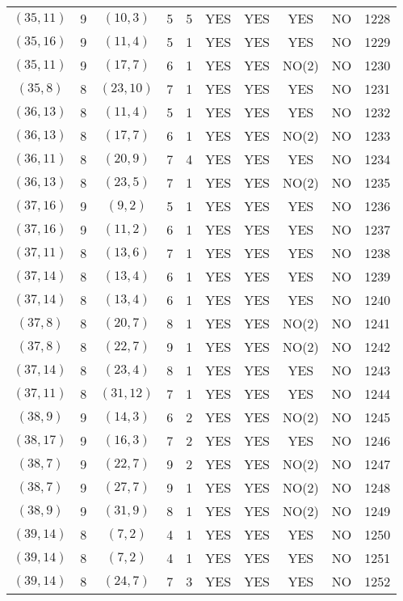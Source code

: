 \begin{longtable}{|c|c|c|c|c|c|c|c|c|c|}
$(35, 11)$ & 9 & $(10, 3)$ & 5 & 5 & YES & YES & YES & NO & 1228\\
$(35, 16)$ & 9 & $(11, 4)$ & 5 & 1 & YES & YES & YES & NO & 1229\\
$(35, 11)$ & 9 & $(17, 7)$ & 6 & 1 & YES & YES & NO(2) & NO & 1230\\
$(35, 8)$ & 8 & $(23, 10)$ & 7 & 1 & YES & YES & YES & NO & 1231\\
$(36, 13)$ & 8 & $(11, 4)$ & 5 & 1 & YES & YES & YES & NO & 1232\\
$(36, 13)$ & 8 & $(17, 7)$ & 6 & 1 & YES & YES & NO(2) & NO & 1233\\
$(36, 11)$ & 8 & $(20, 9)$ & 7 & 4 & YES & YES & YES & NO & 1234\\
$(36, 13)$ & 8 & $(23, 5)$ & 7 & 1 & YES & YES & NO(2) & NO & 1235\\
$(37, 16)$ & 9 & $(9, 2)$ & 5 & 1 & YES & YES & YES & NO & 1236\\
$(37, 16)$ & 9 & $(11, 2)$ & 6 & 1 & YES & YES & YES & NO & 1237\\
$(37, 11)$ & 8 & $(13, 6)$ & 7 & 1 & YES & YES & YES & NO & 1238\\
$(37, 14)$ & 8 & $(13, 4)$ & 6 & 1 & YES & YES & YES & NO & 1239\\
$(37, 14)$ & 8 & $(13, 4)$ & 6 & 1 & YES & YES & YES & NO & 1240\\
$(37, 8)$ & 8 & $(20, 7)$ & 8 & 1 & YES & YES & NO(2) & NO & 1241\\
$(37, 8)$ & 8 & $(22, 7)$ & 9 & 1 & YES & YES & NO(2) & NO & 1242\\
$(37, 14)$ & 8 & $(23, 4)$ & 8 & 1 & YES & YES & YES & NO & 1243\\
$(37, 11)$ & 8 & $(31, 12)$ & 7 & 1 & YES & YES & YES & NO & 1244\\
$(38, 9)$ & 9 & $(14, 3)$ & 6 & 2 & YES & YES & NO(2) & NO & 1245\\
$(38, 17)$ & 9 & $(16, 3)$ & 7 & 2 & YES & YES & YES & NO & 1246\\
$(38, 7)$ & 9 & $(22, 7)$ & 9 & 2 & YES & YES & NO(2) & NO & 1247\\
$(38, 7)$ & 9 & $(27, 7)$ & 9 & 1 & YES & YES & NO(2) & NO & 1248\\
$(38, 9)$ & 9 & $(31, 9)$ & 8 & 1 & YES & YES & NO(2) & NO & 1249\\
$(39, 14)$ & 8 & $(7, 2)$ & 4 & 1 & YES & YES & YES & NO & 1250\\
$(39, 14)$ & 8 & $(7, 2)$ & 4 & 1 & YES & YES & YES & NO & 1251\\
$(39, 14)$ & 8 & $(24, 7)$ & 7 & 3 & YES & YES & YES & NO & 1252\\

\end{longtable}
